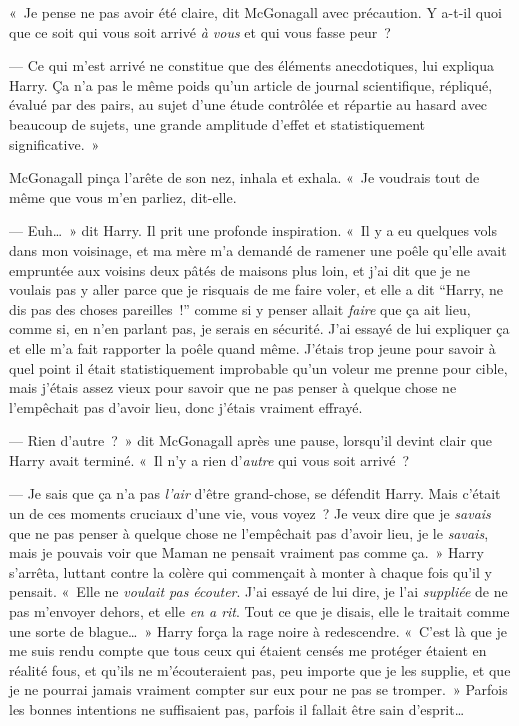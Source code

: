 «~Je pense ne pas avoir été claire, dit McGonagall avec précaution. Y a-t-il quoi que ce soit qui vous soit arrivé \emph{à vous} et qui vous fasse peur~?

--- Ce qui m'est arrivé ne constitue que des éléments anecdotiques, lui expliqua Harry. Ça n'a pas le même poids qu'un article de journal scientifique, répliqué, évalué par des pairs, au sujet d'une étude contrôlée et répartie au hasard avec beaucoup de sujets, une grande amplitude d'effet et statistiquement significative.~»

McGonagall pinça l'arête de son nez, inhala et exhala.
«~Je voudrais tout de même que vous m'en parliez, dit-elle.

--- Euh…~» dit Harry. Il prit une profonde inspiration. «~Il y a eu quelques vols dans mon voisinage, et ma mère m'a demandé de ramener une poêle qu'elle avait empruntée aux voisins deux pâtés de maisons plus loin, et j'ai dit que je ne voulais pas y aller parce que je risquais de me faire voler, et elle a dit “Harry, ne dis pas des choses pareilles~!” comme si y penser allait \emph{faire} que ça ait lieu, comme si, en n'en parlant pas, je serais en sécurité. J'ai essayé de lui expliquer ça et elle m'a fait rapporter la poêle quand même. J'étais trop jeune pour savoir à quel point il était statistiquement improbable qu'un voleur me prenne pour cible, mais j'étais assez vieux pour savoir que ne pas penser à quelque chose ne l'empêchait pas d'avoir lieu, donc j'étais vraiment effrayé.

--- Rien d'autre~?~» dit McGonagall après une pause, lorsqu'il devint clair que Harry avait terminé. «~Il n'y a rien d'\emph{autre} qui vous soit arrivé~?

--- Je sais que ça n'a pas \emph{l'air} d'être grand-chose, se défendit Harry. Mais c'était un de ces moments cruciaux d'une vie, vous voyez~? Je veux dire que je \emph{savais} que ne pas penser à quelque chose ne l'empêchait pas d'avoir lieu, je le \emph{savais}, mais je pouvais voir que Maman ne pensait vraiment pas comme ça.~» Harry s'arrêta, luttant contre la colère qui commençait à monter à chaque fois qu'il y pensait. «~Elle ne \emph{voulait pas écouter}. J'ai essayé de lui dire, je l'ai \emph{suppliée} de ne pas m'envoyer dehors, et elle \emph{en a rit}. Tout ce que je disais, elle le traitait comme une sorte de blague…~» Harry força la rage noire à redescendre. «~C'est là que je me suis rendu compte que tous ceux qui étaient censés me protéger étaient en réalité fous, et qu'ils ne m'écouteraient pas, peu importe que je les supplie, et que je ne pourrai jamais vraiment compter sur eux pour ne pas se tromper.~» Parfois les bonnes intentions ne suffisaient pas, parfois il fallait être sain d'esprit…

